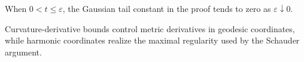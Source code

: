 \begin{remark}
\label{rem:chow-iii-distance-like-small-time-tail}
When \(0<t\le\varepsilon\), the Gaussian tail constant in the proof tends to
zero as \(\varepsilon\downarrow0\).
\end{remark}

\begin{remark}
\label{rem:chow-iii-geodesic-harmonic-coordinate-regularity}
Curvature-derivative bounds control metric derivatives in geodesic
coordinates, while harmonic coordinates realize the maximal regularity used
by the Schauder argument.
\end{remark}

